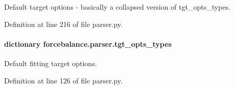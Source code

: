 Default target options -\/ basically a collapsed version of tgt\-\_\-opts\-\_\-types. 



Definition at line 216 of file parser.\-py.

\hypertarget{namespaceforcebalance_1_1parser_a95436b7fb9e99bd7b9f0a040b15fbe3a}{
\paragraph[{tgt\-\_\-opts\-\_\-types}]{\setlength{\rightskip}{0pt plus 5cm}dictionary forcebalance.\-parser.\-tgt\-\_\-opts\-\_\-types}}\label{namespaceforcebalance_1_1parser_a95436b7fb9e99bd7b9f0a040b15fbe3a}


Default fitting target options. 



Definition at line 126 of file parser.\-py.

